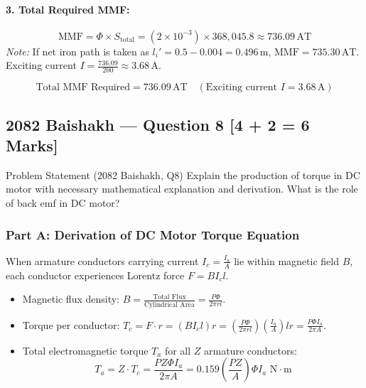 \documentclass[11pt,a4paper,oneside]{article}
\begin{document}
\paragraph{3. Total Required MMF:}
\begin{equation}
  \text{MMF} = \Phi \times S_{\text{total}} = (2 \times 10^{-3}) \times 368,045.8 \approx 736.09\,\mathrm{AT}
\end{equation}
\textit{Note:} If net iron path is taken as $l_i' = 0.5 - 0.004 = 0.496\,\mathrm{m}$, $\text{MMF} = 735.30\,\mathrm{AT}$. Exciting current $I = \frac{736.09}{200} \approx 3.68\,\mathrm{A}$.

\begin{answerbox}
\[
\text{Total MMF Required} = 736.09\,\mathrm{AT} \quad (\text{Exciting current } I = 3.68\,\mathrm{A})
\]
\end{answerbox}

\newpage

\subsection{2082 Baishakh --- Question 8 [4 + 2 = 6 Marks]}

\begin{questionbox}{Problem Statement (2082 Baishakh, Q8)}
Explain the production of torque in DC motor with necessary mathematical explanation and derivation. What is the role of back emf in DC motor?
\end{questionbox}

\subsubsection*{Part A: Derivation of DC Motor Torque Equation}
When armature conductors carrying current $I_c = \frac{I_a}{A}$ lie within magnetic field $B$, each conductor experiences Lorentz force $F = B I_c l$.
\begin{itemize}[leftmargin=1.5em]
  \item Magnetic flux density: $B = \frac{\text{Total Flux}}{\text{Cylindrical Area}} = \frac{P \Phi}{2\pi r l}$.
  \item Torque per conductor: $T_c = F \cdot r = (B I_c l) r = \left(\frac{P \Phi}{2\pi r l}\right) \left(\frac{I_a}{A}\right) l r = \frac{P \Phi I_a}{2\pi A}$.
  \item Total electromagnetic torque $T_a$ for all $Z$ armature conductors:
  \begin{equation}
    T_a = Z \cdot T_c = \frac{P Z \Phi I_a}{2\pi A} = 0.159 \left(\frac{P Z}{A}\right) \Phi I_a \text{ N}\cdot\text{m}
  \end{equation}
\end{itemize}
\end{document}
